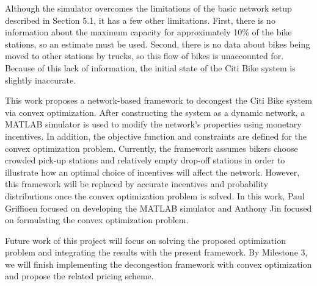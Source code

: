 \documentclass[times, 10pt,twocolumn]{article}
\begin{document}
Although the simulator overcomes the limitations of the basic network setup described in Section 5.1, it has a few other limitations. First, there is no information about the maximum capacity for approximately 10\% of the bike stations, so an estimate must be used. Second, there is no data about bikes being moved to other stations by trucks, so this flow of bikes is unaccounted for. Because of this lack of information, the initial state of the Citi Bike system is slightly inaccurate.




This work proposes a network-based framework to decongest the Citi Bike system via convex optimization. After constructing the system as a dynamic network, a MATLAB simulator is used to modify the network's properties using monetary incentives. In addition, the objective function and constraints are defined for the convex optimization problem. Currently, the framework assumes bikers choose crowded pick-up stations and relatively empty drop-off stations in order to illustrate how an optimal choice of incentives will affect the network. However, this framework will be replaced by accurate incentives and probability distributions once the convex optimization problem is solved. In this work, Paul Griffioen focused on developing the MATLAB simulator and Anthony Jin focused on formulating the convex optimization problem.

Future work of this project will focus on solving the proposed optimization problem and integrating the results with the present framework. By Milestone 3, we will finish implementing the decongestion framework with convex optimization and propose the related pricing scheme.
\end{document}
